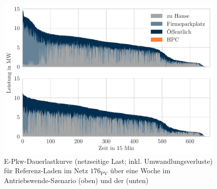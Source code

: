 \begin{figure}[H]
    \centering
    \includegraphics[width=\textwidth]{Bilder/example_load_duration_curve}
    \caption[E-Pkw-Dauerlastkurve für Referenz-Laden im Netz \num{176} über eine Woche im Antriebswende-Szenario und der Sensitivität Firmenparkplatz]{E-Pkw-Dauerlastkurve (netzseitige Last; inkl. Umwandlungsverluste) für Referenz-Laden im Netz \(176_{\text{PV}}\) über eine Woche im Antriebswende-Szenario (oben) und der \SzeFirmenparkplatz (unten)}\label{fig:example_load_curve}
\end{figure}
